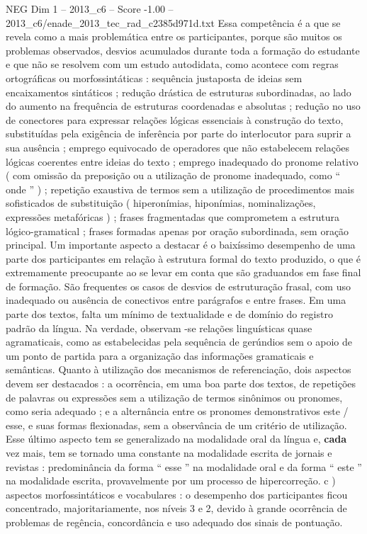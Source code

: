 \begin{textsample}{NEG Dim 1 – 2013\_c6 – Score -1.00 – 2013\_c6/enade\_2013\_tec\_rad\_c2385d971d.txt}
Essa competência é a que se revela como a mais problemática entre os participantes, porque são muitos os problemas observados, desvios acumulados durante toda a formação do estudante e que não se resolvem com um estudo autodidata, como acontece com regras ortográficas ou morfossintáticas : sequência justaposta de ideias sem encaixamentos sintáticos ; redução drástica de estruturas subordinadas, ao lado do aumento na frequência de estruturas coordenadas e absolutas ; redução no uso de conectores para expressar relações lógicas essenciais à construção do texto, substituídas pela exigência de inferência por parte do interlocutor para suprir a sua ausência ; emprego equivocado de operadores que não estabelecem relações lógicas coerentes entre ideias do texto ; emprego inadequado do pronome relativo ( com omissão da preposição ou a utilização de pronome inadequado, como “ onde ” ) ; repetição exaustiva de termos sem a utilização de procedimentos mais sofisticados de substituição ( hiperonímias, hiponímias, nominalizações, expressões metafóricas ) ; frases fragmentadas que comprometem a estrutura lógico-gramatical ; frases formadas apenas por oração subordinada, sem oração principal.
Um importante aspecto a destacar é o baixíssimo desempenho de uma parte dos participantes em relação à estrutura formal do texto produzido, o que é extremamente preocupante ao se levar em conta que são graduandos em fase final de formação.
São frequentes os casos de desvios de estruturação frasal, com uso inadequado ou ausência de conectivos entre parágrafos e entre frases.
Em uma parte dos textos, falta um mínimo de textualidade e de domínio do registro padrão da língua.
Na verdade, observam -se relações linguísticas quase agramaticais, como as estabelecidas pela sequência de gerúndios sem o apoio de um ponto de partida para a organização das informações gramaticais e semânticas.
Quanto à utilização dos mecanismos de referenciação, dois aspectos devem ser destacados : a ocorrência, em uma boa parte dos textos, de repetições de palavras ou expressões sem a utilização de termos sinônimos ou pronomes, como seria adequado ; e a alternância entre os pronomes demonstrativos este / esse, e suas formas flexionadas, sem a observância de um critério de utilização.
Esse último aspecto tem se generalizado na modalidade oral da língua e, \textbf{cada} vez mais, tem se tornado uma constante na modalidade escrita de jornais e revistas : predominância da forma “ esse ” na modalidade oral e da forma “ este ” na modalidade escrita, provavelmente por um processo de hipercorreção. c ) aspectos morfossintáticos e vocabulares : o desempenho dos participantes ficou concentrado, majoritariamente, nos níveis 3 e 2, devido à grande ocorrência de problemas de regência, concordância e uso adequado dos sinais de pontuação.

\end{textsample}
